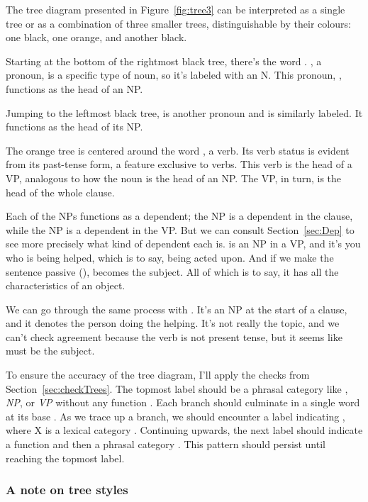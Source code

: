 The tree diagram presented in Figure~\ref{fig:tree3} can be interpreted as a single tree or as a combination of three smaller trees, distinguishable by their colours: one black, one orange, and another black.

Starting at the bottom of the rightmost black tree, there's the word . , a pronoun, is a specific type of noun, so it's labeled with an N. This pronoun, , functions as the head of an NP.

Jumping to the leftmost black tree,  is another pronoun and is similarly labeled. It functions as the head of its NP.

The orange tree is centered around the word , a verb. Its verb status is evident from its past-tense form, a feature exclusive to verbs. This verb is the head of a VP, analogous to how the noun is the head of an NP. The VP, in turn, is the head of the whole clause.

Each of the NPs functions as a dependent; the  NP is a dependent in the clause, while the  NP is a dependent in the VP. But we can consult Section~\ref{sec:Dep} to see more precisely what kind of dependent each is.  is an NP in a VP, and it's you who is being helped, which is to say, being acted upon. And if we make the sentence passive (),  becomes the subject. All of which is to say, it has all the characteristics of an object.

We can go through the same process with . It's an NP at the start of a clause, and it denotes the person doing the helping. It's not really the topic, and we can't check agreement because the verb is not present tense, but it seems like  must be the subject.

To ensure the accuracy of the tree diagram, I'll apply the checks from Section~\ref{sec:checkTrees}. The topmost label should be a phrasal category like , \textit{NP}, or \textit{VP} without any function . Each branch should culminate in a single word at its base . As we trace up a branch, we should encounter a label indicating , where X is a lexical category . Continuing upwards, the next label should indicate a function and then a phrasal category . This pattern should persist until reaching the topmost label.

\subsubsection*{A note on tree styles}

